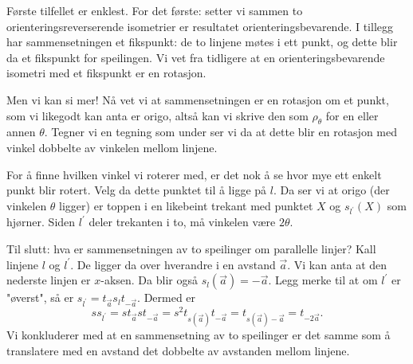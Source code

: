 \documentclass[11pt, norsk]{article}
\begin{document}
\begin{losn}
Første tilfellet er enklest. For det første: setter vi sammen to orienteringsreverserende isometrier er resultatet orienteringsbevarende. I tillegg har sammensetningen et fikspunkt: de to linjene møtes i ett punkt, og dette blir da et fikspunkt for speilingen. Vi vet fra tidligere at en orienteringsbevarende isometri med et fikspunkt er en rotasjon.

Men vi kan si mer! Nå vet vi at sammensetningen er en rotasjon om et punkt, som vi likegodt kan anta er origo, altså kan vi skrive den som $\rho_\theta$ for en eller annen $\theta$. Tegner vi en tegning som under ser vi da at dette blir en rotasjon med vinkel dobbelte av vinkelen mellom linjene.
\begin{figure}[h]
\begin{center}
\end{center}
\end{figure}
For å finne hvilken vinkel vi roterer med, er det nok å se hvor mye ett enkelt punkt blir rotert. Velg da dette punktet til å ligge på $l$. Da ser vi at origo (der vinkelen $\theta$ ligger) er toppen i en likebeint trekant med punktet $X$ og $s_{l^\prime}(X)$ som hjørner. Siden $l^\prime$ deler trekanten i to, må vinkelen være $2\theta$.

Til slutt: hva er sammensetningen av to speilinger om parallelle linjer? Kall linjene $l$ og $l^\prime$. De ligger da over hverandre i en avstand $\vec a$. Vi kan anta at den nederste linjen er $x$-aksen. Da blir også $s_l(\vec a)=-\vec a$. Legg merke til at om $l^\prime$ er "øverst", så er $s_{l^\prime}=t_{\vec a}s_l t_{-\vec a}$. Dermed er
$$
s s_{l^\prime} = s t_{\vec a} st_{-\vec a} = s^2 t_{s(\vec a)} t_{-\vec a} = t_{s(\vec a) - \vec a}=t_{-2\vec a}.
$$
Vi konkluderer med at en sammensetning av to speilinger er det samme som å translatere med en avstand det dobbelte av avstanden mellom linjene.
\end{losn}
\end{document}
